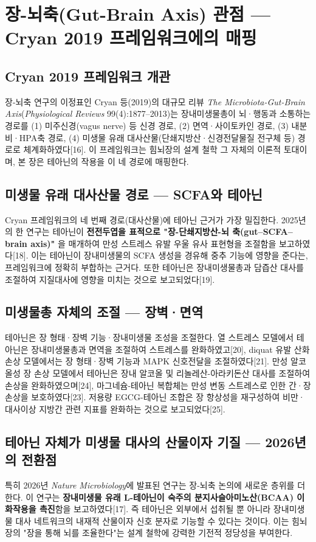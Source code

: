 \documentclass[11pt,oneside]{book}
\begin{document}
\section{장-뇌축(Gut-Brain Axis) 관점 — Cryan 2019 프레임워크에의 매핑}
\subsection{Cryan 2019 프레임워크 개관}
장-뇌축 연구의 이정표인 Cryan 등(2019)의 대규모 리뷰 \textit{The Microbiota-Gut-Brain Axis}(\textit{Physiological Reviews} 99(4):1877–2013)는 장내미생물총이 뇌·행동과 소통하는 경로를 (1) 미주신경(vagus nerve) 등 신경 경로, (2) 면역·사이토카인 경로, (3) 내분비·HPA축 경로, (4) 미생물 유래 대사산물(단쇄지방산·신경전달물질 전구체 등) 경로로 체계화하였다[16]. 이 프레임워크는 힘뇌장의 설계 철학 그 자체의 이론적 토대이며, 본 장은 테아닌의 작용을 이 네 경로에 매핑한다.

\subsection{미생물 유래 대사산물 경로 — SCFA와 테아닌}
Cryan 프레임워크의 네 번째 경로(대사산물)에 테아닌 근거가 가장 밀집한다. 2025년의 한 연구는 테아닌이 \textbf{전전두엽을 표적으로 "장-단쇄지방산-뇌 축(gut–SCFA–brain axis)"} 을 매개하여 만성 스트레스 유발 우울 유사 표현형을 조절함을 보고하였다[18]. 이는 테아닌이 장내미생물의 SCFA 생성을 경유해 중추 기능에 영향을 준다는, 프레임워크에 정확히 부합하는 근거다. 또한 테아닌은 장내미생물총과 담즙산 대사를 조절하여 지질대사에 영향을 미치는 것으로 보고되었다[19].

\subsection{미생물총 자체의 조절 — 장벽·면역}
테아닌은 장 형태·장벽 기능·장내미생물 조성을 조절한다. 열 스트레스 모델에서 테아닌은 장내미생물총과 면역을 조절하여 스트레스를 완화하였고[20], diquat 유발 산화 손상 모델에서는 장 형태·장벽 기능과 MAPK 신호전달을 조절하였다[21]. 만성 알코올성 장 손상 모델에서 테아닌은 장내 알코올 및 리놀레산-아라키돈산 대사를 조절하여 손상을 완화하였으며[24], 마그네슘-테아닌 복합체는 만성 변동 스트레스로 인한 간·장 손상을 보호하였다[23]. 저용량 EGCG-테아닌 조합은 장 항상성을 재구성하여 비만·대사이상 지방간 관련 지표를 완화하는 것으로 보고되었다[25].

\subsection{테아닌 자체가 미생물 대사의 산물이자 기질 — 2026년의 전환점}
특히 2026년 \textit{Nature Microbiology}에 발표된 연구는 장-뇌축 논의에 새로운 층위를 더한다. 이 연구는 \textbf{장내미생물 유래 L-테아닌이 숙주의 분지사슬아미노산(BCAA) 이화작용을 촉진}함을 보고하였다[17]. 즉 테아닌은 외부에서 섭취될 뿐 아니라 장내미생물 대사 네트워크의 내재적 산물이자 신호 분자로 기능할 수 있다는 것이다. 이는 힘뇌장의 "장을 통해 뇌를 조율한다"는 설계 철학에 강력한 기전적 정당성을 부여한다.
\end{document}
